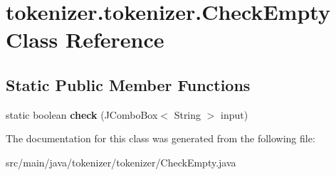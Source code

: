 \hypertarget{classtokenizer_1_1tokenizer_1_1_check_empty}{}\section{tokenizer.\+tokenizer.\+Check\+Empty Class Reference}
\label{classtokenizer_1_1tokenizer_1_1_check_empty}
\subsection*{Static Public Member Functions}
\begin{DoxyCompactItemize}
\item 
\hypertarget{classtokenizer_1_1tokenizer_1_1_check_empty_a910efb1028beefb9dcf414d1bbc5a1f5}{}static boolean {\bfseries check} (J\+Combo\+Box$<$ String $>$ input)\label{classtokenizer_1_1tokenizer_1_1_check_empty_a910efb1028beefb9dcf414d1bbc5a1f5}

\end{DoxyCompactItemize}


The documentation for this class was generated from the following file\+:\begin{DoxyCompactItemize}
\item 
src/main/java/tokenizer/tokenizer/Check\+Empty.\+java\end{DoxyCompactItemize}
